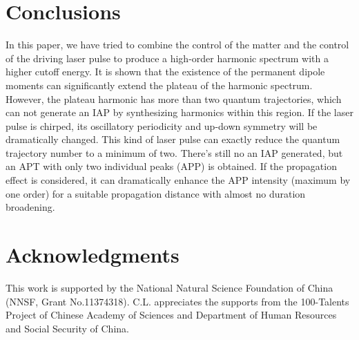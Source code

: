 \documentclass[10pt,letterpaper]{article}
\begin{document}


\section{Conclusions}
In this paper, we have tried to combine the control of the matter and the control of the driving laser pulse to produce a high-order harmonic spectrum with a higher cutoff energy. It is shown that the existence of the permanent dipole moments can significantly extend the plateau of the harmonic spectrum. However, the plateau harmonic has more than two quantum trajectories, which can not generate an IAP by synthesizing harmonics within this region. If the laser pulse is chirped, its oscillatory periodicity and up-down symmetry will be dramatically changed. This kind of laser pulse can exactly reduce the quantum trajectory number to a minimum of two. There's still no an IAP generated, but an APT with only two individual peaks (APP) is obtained. If the propagation effect is considered, it can dramatically enhance the APP intensity (maximum by one order) for a suitable propagation distance with almost no duration broadening.

\section*{Acknowledgments}
This work is supported by the National Natural Science Foundation of China (NNSF, Grant
No.11374318). C.L. appreciates the supports from the 100-Talents Project of Chinese Academy
of Sciences and Department of Human Resources and Social Security of China.
\end{document}
